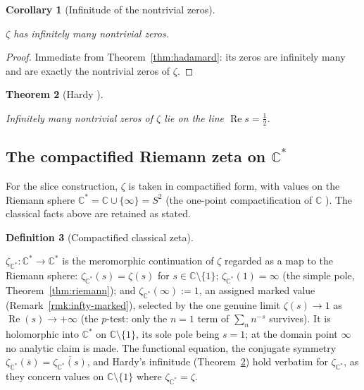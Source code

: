 \documentclass[11pt]{article}
\newcommand{\CC}{\mathbb{C}}
\newcommand{\Cstar}{\CC^{*}}
\newcommand{\zetaC}{\zeta_{\Cstar}}
\DeclareMathOperator{\re}{Re}
\providecommand{\lean}[1]{}
\providecommand{\uses}[1]{}
\theoremstyle{plain}
\newtheorem{theorem}{Theorem}[section]
\newtheorem{corollary}[theorem]{Corollary}
\theoremstyle{definition}
\newtheorem{definition}[theorem]{Definition}
\theoremstyle{remark}
\begin{document}
\begin{corollary}[Infinitude of the nontrivial zeros]\label{cor:hadamard-infinitude}
\lean{riemannZeta_nontrivialZeros_infinite}
\uses{thm:hadamard}
$\zeta$ has infinitely many nontrivial zeros.
\end{corollary}
\begin{proof}
Immediate from Theorem~\ref{thm:hadamard}: its zeros are infinitely many and are exactly
the nontrivial zeros of $\zeta$.
\end{proof}

\begin{theorem}[Hardy \cite{Hardy14}]\label{thm:hardy}
\lean{zeta_criticalLine_zeros_infinite}
Infinitely many nontrivial zeros of $\zeta$ lie on the line $\re s=\tfrac12$.
\end{theorem}

\subsection*{The compactified Riemann zeta on \texorpdfstring{$\Cstar$}{C*}}

For the slice construction, $\zeta$ is taken in compactified form, with values on the
Riemann sphere $\Cstar=\CC\cup\{\infty\}=S^2$ (the one-point compactification of $\CC$
\cite{Munkres00}). The classical facts above are retained as stated.

\begin{definition}[Compactified classical zeta]\label{def:zeta-Cstar}
\lean{zetaC, zetaC_coe, zetaC_one, zetaC_infty}
\uses{thm:riemann}
$\zetaC:\Cstar\to\Cstar$ is the meromorphic continuation of $\zeta$ regarded as a map to
the Riemann sphere: $\zetaC(s)=\zeta(s)$ for $s\in\CC\setminus\{1\}$; $\zetaC(1)=\infty$
(the simple pole, Theorem~\ref{thm:riemann}); and $\zetaC(\infty):=1$, an assigned
marked value (Remark~\ref{rmk:infty-marked}), selected by the one genuine limit
$\zeta(s)\to1$ as $\re(s)\to+\infty$ (the $p$-test: only the $n=1$ term of
$\sum_n n^{-s}$ survives). It is holomorphic into $\Cstar$ on $\CC\setminus\{1\}$,
its sole pole being $s=1$; at the domain point $\infty$ no analytic claim is made.
The functional equation, the conjugate symmetry
$\zetaC(\bar s)=\overline{\zetaC(s)}$, and Hardy's infinitude (Theorem~\ref{thm:hardy}) hold
verbatim for $\zetaC$, as they concern values on $\CC\setminus\{1\}$ where $\zetaC=\zeta$.
\end{definition}
\end{document}
